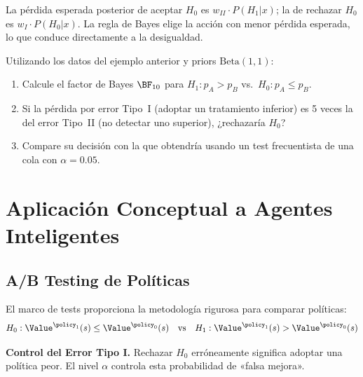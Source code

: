 \begin{proofsketch}
La pérdida esperada posterior de aceptar $H_0$ es $w_{II} \cdot P(H_1|x)$; la
de rechazar $H_0$ es $w_I \cdot P(H_0|x)$. La regla de Bayes elige la acción con
menor pérdida esperada, lo que conduce directamente a la desigualdad.
\end{proofsketch}

\begin{exercise}
\label{ex:ch4-ej-bf}
Utilizando los datos del ejemplo anterior y priors $\text{Beta}(1,1)$:
\begin{enumerate}[label=(\alph*)]
  \item Calcule el factor de Bayes $\BF_{10}$ para $H_1: p_A > p_B$ vs.\
        $H_0: p_A \leq p_B$.
  \item Si la pérdida por error Tipo~I (adoptar un tratamiento inferior) es 5
        veces la del error Tipo~II (no detectar uno superior), ¿rechazaría $H_0$?
  \item Compare su decisión con la que obtendría usando un test frecuentista
        de una cola con $\alpha = 0.05$.
\end{enumerate}
\end{exercise}


\section{Aplicación Conceptual a Agentes Inteligentes}
\label{sec:ch4-langgraph}

\subsection{A/B Testing de Políticas}
\label{sec:ch4-ab-testing}

El marco de tests proporciona la metodología rigurosa para comparar políticas:
\[
	H_0: \Value^{\policy_1}(s) \leq \Value^{\policy_0}(s) \quad \text{vs} \quad
	H_1: \Value^{\policy_1}(s) > \Value^{\policy_0}(s)
\]

\textbf{Control del Error Tipo I.} Rechazar $H_0$ erróneamente significa
adoptar una política peor. El nivel $\alpha$ controla esta probabilidad
de «falsa mejora».

